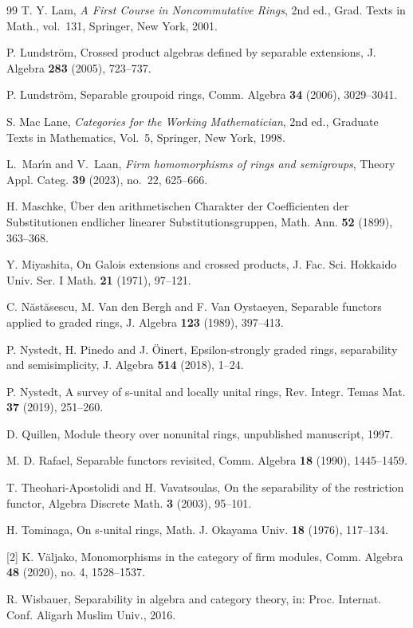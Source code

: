 \documentclass[12pt]{amsart}
\theoremstyle{definition}
\begin{document}
\begin{thebibliography}{99}
T. Y. Lam,
\emph{A First Course in Noncommutative Rings},
2nd ed., Grad. Texts in Math., vol.~131,
Springer, New York, 2001.

P. Lundstr\"om,
Crossed product algebras defined by separable extensions,
J. Algebra \textbf{283} (2005), 723--737.

P. Lundstr\"om,
Separable groupoid rings,
Comm. Algebra \textbf{34} (2006), 3029--3041.

S. Mac Lane,
\emph{Categories for the Working Mathematician},
2nd ed.,
Graduate Texts in Mathematics, Vol.~5,
Springer, New York, 1998.

L.~Mar{\'\i}n and V.~Laan,
\emph{Firm homomorphisms of rings and semigroups},
Theory Appl. Categ. \textbf{39} (2023), no.~22, 625--666.

H. Maschke,
\"Uber den arithmetischen Charakter der Coefficienten der Substitutionen endlicher linearer Substitutionsgruppen,
Math. Ann. \textbf{52} (1899), 363--368.

Y. Miyashita,
On Galois extensions and crossed products,
J. Fac. Sci. Hokkaido Univ. Ser. I Math. \textbf{21} (1971), 97--121.

C. N\u{a}st\u{a}sescu, M. Van den Bergh and F. Van Oystaeyen,
Separable functors applied to graded rings,
J. Algebra \textbf{123} (1989), 397--413.

P. Nystedt, H. Pinedo and J. \"Oinert,
Epsilon-strongly graded rings, separa\-bility and semisimplicity,
J. Algebra \textbf{514} (2018), 1--24.

P. Nystedt,
A survey of s-unital and locally unital rings,
Rev. Integr. Temas Mat. \textbf{37} (2019), 251--260.

D. Quillen,
Module theory over nonunital rings,
unpublished manuscript, 1997.

M. D. Rafael,
Separable functors revisited,
Comm. Algebra \textbf{18} (1990), 1445--1459.

T. Theohari-Apostolidi and H. Vavatsoulas,
On the separability of the restriction functor,
Algebra Discrete Math. \textbf{3} (2003), 95--101.

H. Tominaga,
On s-unital rings,
Math. J. Okayama Univ. \textbf{18} (1976), 117--134.

[2] K. V\"{a}ljako, 
Monomorphisms in the category of firm modules, 
Comm. Algebra \textbf{48} (2020), no. 4, 1528--1537.

R. Wisbauer,
Separability in algebra and category theory,
in: Proc. Internat. Conf. Aligarh Muslim Univ., 2016.

\end{thebibliography}
\end{document}
